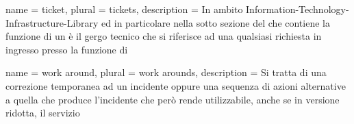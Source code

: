 {
	name		= {ticket},
	plural		= {tickets},
	description = {In ambito \ac{Information-Technology-Infrastructure-Library} ed in particolare nella sotto sezione del  che contiene la funzione di  un  è il gergo tecnico che si riferisce ad una qualsiasi richiesta in ingresso presso la funzione di }
}

{
	name		= {work around},
	plural		= {work arounds},
	description	= {Si tratta di una correzione temporanea ad un incidente oppure una sequenza di azioni alternative a quella che produce l'incidente che però rende utilizzabile, anche se in versione ridotta, il servizio}
}